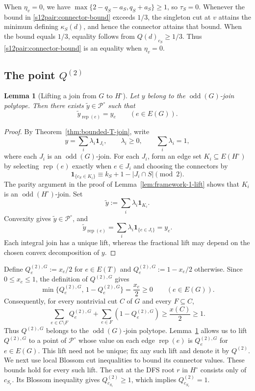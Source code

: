 \documentclass[11pt]{amsart}
\DeclareMathOperator{\odd}{odd}
\newcommand{\rep}[1]{\operatorname{rep}(#1)}
\newcommand{\1}{\mathbbm{1}}
\newtheorem{lemma}[theorem]{Lemma}
\begin{document}
When $\eta_v=0$, we have
$\max\{2-q_S-a_S,q_S+a_S\}\ge1$, so $\tau_S=0$.
Whenever the bound in \eqref{s12pair:connector-bound}
exceeds $1/3$, the singleton cut at $v$ attains the minimum
defining $\kappa_S(d)$, and hence the connector attains
that bound. When the bound equals $1/3$, equality follows
from ${Q(d)}_{c_S}\ge1/3$.
{Thus \eqref{s12pair:connector-bound} is an equality
when $\eta_v=0$.}




\subsection{The point \texorpdfstring{${Q^{(2)}}$}{Q(2)}}
\label{s12pair:half-subtour}

\begin{lemma}[Lifting a join from $G$ to $H^\circ$]
\label{s10n:join-lifting}
{{Let $y$ belong to the
$\odd(G)$-join polytope.}
Then there exists $\widetilde y\in\mathcal P^\circ$ such that
\[
 \widetilde y_{\rep{e}}=y_e\qquad(e\in E(G)).
\]}
\end{lemma}
\begin{proof}
{By Theorem~\ref{thm:bounded-T-join}, write
\[
 y=\sum_i\lambda_i\mathbf 1_{J_i},\qquad
 \lambda_i\ge0,\qquad\sum_i\lambda_i=1,
\]
where each $J_i$ is an $\odd(G)$-join.
For each $J_i$, form an edge set $K_i\subseteq E(H^\circ)$
by selecting $\rep{e}$ exactly when $e\in J_i$
and choosing the connectors by
\begin{equation}\label{s10n:connector-parity}
 \mathbf 1_{\{c_S\in K_i\}}
 \equiv k_S+1-|J_i\cap S|\pmod2.
\end{equation}
The parity argument in the proof of
Lemma~\ref{lem:framework-1-lift} shows that $K_i$ is an
$\odd(H^\circ)$-join. Set
\[
 \widetilde y:=\sum_i\lambda_i\mathbf 1_{K_i}.
\]
Convexity gives $\widetilde y\in\mathcal P^\circ$, and
\[
 \widetilde y_{\rep{e}}
 =\sum_i\lambda_i\mathbf 1_{\{e\in J_i\}}=y_e.
\]
Each integral join has a unique lift, whereas the fractional
lift may depend on the chosen convex decomposition of $y$.}
\end{proof}

{Define $Q^{(2),G}_e:=x_e/2$ for $e\in E(T)$
and $Q^{(2),G}_e:=1-x_e/2$ otherwise. Since $0\le x_e\le1$, the definition of $Q^{(2),G}$ gives
\[
 \min\{Q^{(2),G}_e,\,1-Q^{(2),G}_e\}
 =\frac{x_e}{2}\ge0
 \qquad(e\in E(G)).
\]Consequently, for every
nontrivial cut $C$ of $G$ and every $F\subseteq C$,
\[
 \sum_{e\in C\setminus F}Q^{(2),G}_e
 +\sum_{e\in F}(1-Q^{(2),G}_e)
 \ge\frac{x(C)}2\ge1.
\]
{Thus $Q^{(2),G}$ belongs to the
$\odd(G)$-join polytope.}
Lemma~\ref{s10n:join-lifting} allows us to lift $Q^{(2),G}$
to a point of $\mathcal P^\circ$ whose value on each edge
$\rep{e}$ is $Q^{(2),G}_e$ for $e\in E(G)$. This lift need not be unique;
fix any such lift and denote it by $Q^{(2)}$.
We next use local Blossom cut inequalities to bound its
connector values. These bounds hold for every such lift.
The cut at the DFS root $r$ in $H^\circ$ consists only of
$c_{S_r}$. Its Blossom inequality gives
$Q^{(2)}_{c_{S_r}}\ge1$, which implies $Q^{(2)}_{c_{S_r}}=1$.}
\end{document}
